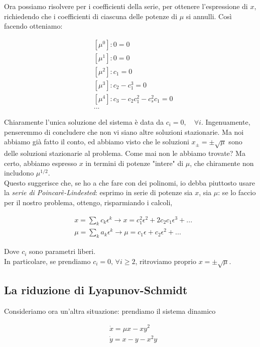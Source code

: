 \documentclass{report}
\begin{document}
Ora possiamo risolvere per i coefficienti della serie, per ottenere l'espressione di $x$, richiedendo che i coefficienti di ciascuna delle potenze di $\mu$ si annulli. Così facendo otteniamo: 

\begin{align}
    &[\mu^0]: 0=0 \\ &[\mu^1]: 0=0 \\ &[\mu^2]: c_1=0 \\ &[\mu^3]: c_2 -c_1^3=0 \\ &[\mu^4]: c_3 -c_2c_1^2 - c_s^2c_1=0 \\ &...
\end{align}

Chiaramente l'unica soluzione del sistema è data da $c_i = 0, \quad \forall i$. Ingenuamente, penseremmo di concludere che non vi siano altre soluzioni stazionarie. Ma noi abbiamo già fatto il conto, ed abbiamo visto che le soluzioni $x_\pm = \pm \sqrt{\mu}$ sono delle soluzioni stazionarie al problema. Come mai non le abbiamo trovate? Ma certo, abbiamo espresso $x$ in termini di potenze "intere" di $\mu$, che chiramente non includono $\mu^{1/2}$. \\

Questo suggerisce che, se ho a che fare con dei polinomi, io debba piuttosto usare la \emph{serie di Poincarè-Lindested}: esprimo in serie di potenze sia $x$, sia $\mu$: se lo faccio per il nostro problema, ottengo, risparmiando i calcoli, 

\begin{align}
    &x = \sum_k c_k \epsilon^k \rightarrow x = c_1^2\epsilon^2 + 2c_2c_1\epsilon^3 + ...\\ &\mu = \sum_k a_k \epsilon^k  \rightarrow \mu = c_1\epsilon + c_2\epsilon^2 + ...
\end{align}

Dove $c_i$ sono parametri liberi. \\
In particolare, se prendiamo $c_i =0, \,  \forall i \geq 2$, ritroviamo proprio $x = \pm \sqrt{\mu}$. \\


\subsection{La riduzione di Lyapunov-Schmidt}
Consideriamo ora un'altra situazione: 
prendiamo il sistema dinamico

\begin{align}
    &\dot{x} = \mu x - xy^2 \\ &\dot{y} = x - y - x^2y
\end{align}
\end{document}
